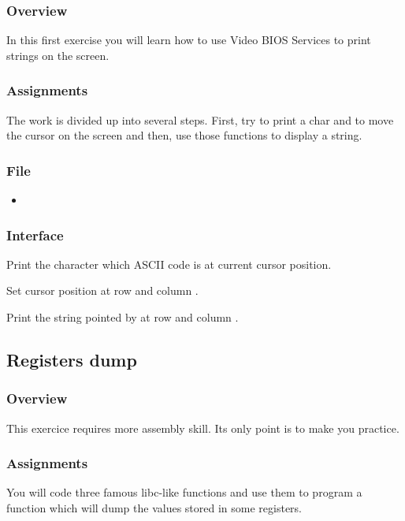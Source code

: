 \subsubsection*{Overview}
In this first exercise you will learn how to use Video BIOS Services to
print strings on the screen.

\subsubsection*{Assignments}
The work is divided up into several steps. First, try to print a char and
to move the cursor on the screen and then, use those functions to display
a string.

\subsubsection*{File}
\begin{itemize}
  \item {}
\end{itemize}

\subsubsection*{Interface}
{
  Print the character which ASCII code is  at current cursor
  position.
}

{
  Set cursor position at row  and column .
}

{
  Print the string pointed by  at row  and
  column .
}

%
%

\newpage

\subsection{Registers dump}

\subsubsection*{Overview}
This exercice requires more assembly skill. Its only point is to make you
practice.

\subsubsection*{Assignments}
You will code three famous libc-like functions and use them to program
a function which will dump the values stored in some registers.

